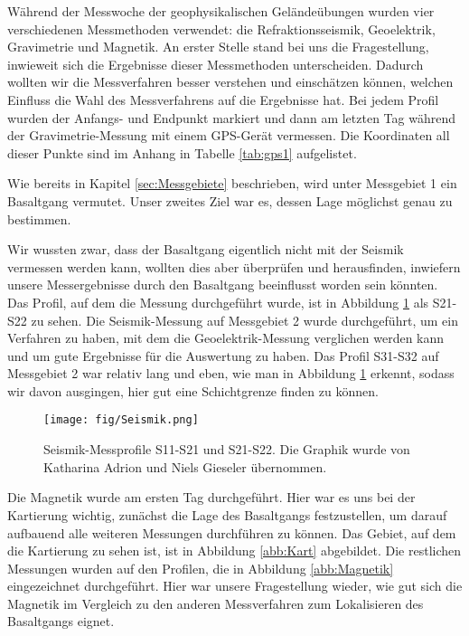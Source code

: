 Während der Messwoche der geophysikalischen Geländeübungen wurden vier verschiedenen Messmethoden verwendet: die Refraktionsseismik, Geoelektrik, Gravimetrie und Magnetik. An erster Stelle stand bei
uns die Fragestellung, inwieweit sich die Ergebnisse dieser Messmethoden unterscheiden. Dadurch wollten wir die Messverfahren besser verstehen und einschätzen können, welchen Einfluss die Wahl des Messverfahrens auf die Ergebnisse hat. Bei jedem Profil wurden der Anfangs- und Endpunkt markiert und dann am letzten Tag während der Gravimetrie-Messung mit einem GPS-Gerät vermessen. Die Koordinaten all dieser Punkte sind im Anhang in Tabelle \ref{tab:gps1} aufgelistet.

Wie bereits in Kapitel \ref{sec:Messgebiete}  beschrieben, wird unter Messgebiet 1 ein Basaltgang vermutet. Unser zweites Ziel war es, dessen Lage möglichst genau zu bestimmen. 

Wir wussten zwar, dass der Basaltgang eigentlich nicht mit der Seismik vermessen werden kann,
wollten dies aber überprüfen und herausfinden, inwiefern unsere Messergebnisse durch den Basaltgang beeinflusst worden sein könnten. Das Profil, auf dem die Messung durchgeführt wurde, ist in 
Abbildung \ref{abb:Seismik} als S21-S22 zu sehen.
Die Seismik-Messung auf Messgebiet 2 wurde durchgeführt, um ein Verfahren zu haben, mit dem die Geoelektrik-Messung verglichen werden kann und um gute Ergebnisse für die Auswertung zu haben.
Das Profil S31-S32 auf Messgebiet 2 war relativ lang und eben, wie man in Abbildung \ref{abb:Seismik} erkennt, sodass wir davon ausgingen, hier gut eine Schichtgrenze finden zu können.

\begin{figure}[ht]
 \centering
 \texttt{[image: fig/Seismik.png]}
 \caption[Seismik- Messprofile S11-S21 und S21-S22]{Seismik-Messprofile S11-S21 und S21-S22. Die Graphik wurde von Katharina Adrion und Niels Gieseler übernommen.}
 \label{abb:Seismik}
\end{figure}

Die Magnetik wurde am ersten Tag durchgeführt. Hier war es uns bei der Kartierung wichtig, zunächst die Lage des Basaltgangs festzustellen, um darauf aufbauend alle weiteren Messungen durchführen zu können.
Das Gebiet, auf dem die Kartierung zu sehen ist, ist in Abbildung \ref{abb:Kart} abgebildet. Die restlichen Messungen wurden auf den Profilen, die in Abbildung \ref{abb:Magnetik} eingezeichnet durchgeführt.
Hier war unsere Fragestellung wieder, wie gut sich die Magnetik im Vergleich zu den anderen Messverfahren zum Lokalisieren des Basaltgangs eignet.

